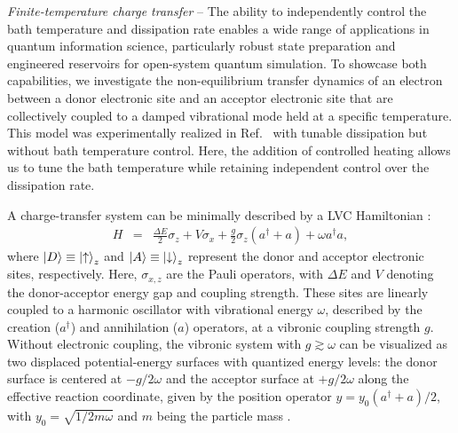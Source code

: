 \documentclass[%
reprint,
superscriptaddress,
amsmath,amssymb,
aps,
prl,
floatfix,
]{revtex4-2}
\begin{document}

\emph{Finite-temperature charge transfer} -- The ability to independently control the bath temperature and dissipation rate enables a wide range of applications in quantum information science, particularly robust state preparation and engineered reservoirs for open-system quantum simulation. To showcase both capabilities, we investigate the non-equilibrium transfer dynamics of an electron between a donor electronic site and an acceptor electronic site that are collectively coupled to a damped vibrational mode held at a specific temperature. This model was experimentally realized in Ref.~\cite{so2024electrontransfer} with tunable dissipation but without bath temperature control.
Here, the addition of controlled heating allows us to tune the bath temperature while retaining independent control over the dissipation rate.

A charge-transfer system can be minimally described by a LVC Hamiltonian \cite{schlawin2021electrontransfer,so2024electrontransfer}:
\begin{eqnarray}
H &=& \frac{\Delta E}{2}\sigma_z + V \sigma_x + \frac{g}{2}\sigma_z (a^\dagger + a) + \omega a^\dagger a,
\label{eq_H}
\end{eqnarray}
where $\ket{D}\equiv\ket{\uparrow}_z$ and $\ket{A}\equiv\ket{\downarrow}_z$ represent the donor and acceptor electronic sites, respectively. Here, $\sigma_{x,z}$ are the Pauli operators, with $\Delta E$ and $V$ denoting the donor-acceptor energy gap and coupling strength. These sites are linearly coupled to a harmonic oscillator with vibrational energy $\omega$, described by the creation ($a^\dagger$) and annihilation ($a$) operators, at a vibronic coupling strength $g$. Without electronic coupling, the vibronic system with $g\gtrsim\omega$ can be visualized as two displaced potential-energy surfaces with quantized energy levels: the donor surface is centered at $-g/2\omega$ and the acceptor surface at $+g/2\omega$ along the effective reaction coordinate, given by the position operator $y = y_0(a^\dagger+a)/2$, with $y_0 = \sqrt{1/2m\omega}$ and $m$ being the particle mass \cite{schlawin2021electrontransfer,so2024electrontransfer}.
\end{document}
